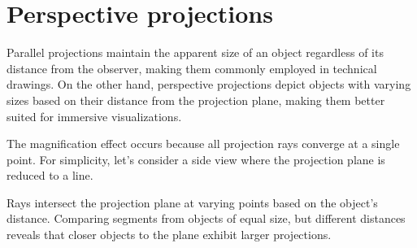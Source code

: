 \section{Perspective projections}

Parallel projections maintain the apparent size of an object regardless of its distance from the observer, making them commonly employed in technical drawings. 
On the other hand, perspective projections depict objects with varying sizes based on their distance from the projection plane, making them better suited for immersive visualizations.

The magnification effect occurs because all projection rays converge at a single point.
For simplicity, let's consider a side view where the projection plane is reduced to a line.

Rays intersect the projection plane at varying points based on the object's distance. 
Comparing segments from objects of equal size, but different distances reveals that closer objects to the plane exhibit larger projections.

